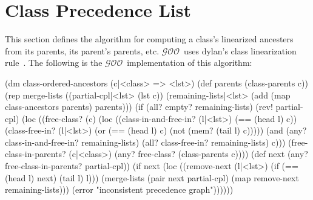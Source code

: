 \documentclass[twoside,twocolumn,9pt]{extarticle}
\newcommand{\goo}{$\mathcal{GOO}$}
\begin{document}
% 
% 
% 
% 




\appendix

\section{Class Precedence List}
\label{cpl}

This section defines the algorithm for computing a class's linearized
ancesters from its parents, its parent's parents, etc.  \goo\ uses
dylan's class linearization rule~\cite{dylan-cpl}.  The following is
the \goo\ implementation of this algorithm:

\begin{exv}
(dm class-ordered-ancestors (c|<class> => <lst>)
  (def parents (class-parents c))
  (rep merge-lists
      ((partial-cpl|<lst>     
         (lst c)) 
       (remaining-lists|<lst> 
         (add (map class-ancestors parents) parents)))
    (if (all? empty? remaining-lists)
        (rev! partial-cpl)
        (loc ((free-class? (c)
                (loc ((class-in-and-free-in? (l|<lst>)
                        (== (head l) c))
                      (class-free-in? (l|<lst>)
                        (or (== (head l) c) (not (mem? (tail l) c)))))
                  (and (any? class-in-and-free-in? remaining-lists)
                       (all? class-free-in? remaining-lists)
                       c)))
              (free-class-in-parents? (c|<class>)
                (any? free-class? (class-parents c))))
          (def next (any? free-class-in-parents? partial-cpl))
          (if next
              (loc ((remove-next (l|<lst>)
                      (if (== (head l) next) (tail l) l)))
                (merge-lists 
                  (pair next partial-cpl)
                   (map remove-next remaining-lists)))
              (error "inconsistent precedence graph"))))))
\end{exv}
\end{document}
